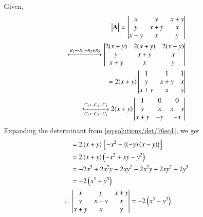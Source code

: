 Given,
\begin{align}
	 \begin{vmatrix}\mathbf{A}\end{vmatrix} = \begin{vmatrix}x & y & x+y\\ y & x+y & x\\ x+y & x &y\end{vmatrix}\\
	\xleftrightarrow{ R_1 \leftarrow R_1 + R_2 + R_3} \begin{vmatrix}2(x + y) & 2(x + y) & 2(x + y)\\ y & x+y & x\\ x+y & x &y\end{vmatrix}\\
	= 2(x + y)\begin{vmatrix}1 & 1 & 1\\ y & x+y & x\\ x+y & x &y\end{vmatrix}\\
	\xleftrightarrow[C_3 \leftarrow C_3 - C_1]{C_2 \leftarrow C_2 - C_1}
	2(x + y) \begin{vmatrix}1 & 0 & 0\\ y & x & x-y\\ x+y & -y &-x\end{vmatrix}\label{eq:solutions/det/76eq1}
\end{align}
Expanding the determinant from \eqref{eq:solutions/det/76eq1}, we get
\begin{align}
     &= 2\left(x + y\right){}\left[-x^2 - \left\{\left(-y\right)\left(x-y\right)\right\}\right]\\
     &= 2\left(x + y\right) \left(-x^2 + xy - y^2\right)\\
     &= -2x^3 + 2x^2y - 2xy^2 - 2x^2y + 2xy^2 - 2y^3\\
     &= -2\left(x^3 + y^3\right)\\
     \therefore{}&\begin{vmatrix}x & y & x+y\\ y & x+y & x\\ x+y & x &y\end{vmatrix} = -2\left(x^3 + y^3\right)
\end{align}
